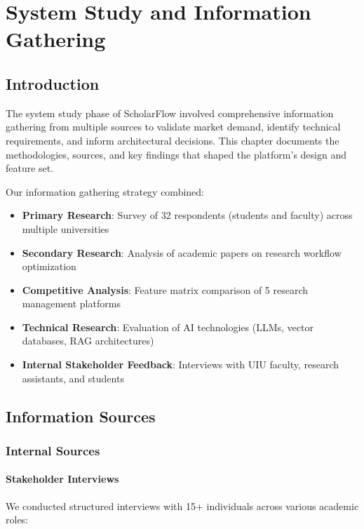 \chapter{System Study and Information Gathering}

\section{Introduction}

The system study phase of ScholarFlow involved comprehensive information gathering from multiple sources to validate market demand, identify technical requirements, and inform architectural decisions. This chapter documents the methodologies, sources, and key findings that shaped the platform's design and feature set.

Our information gathering strategy combined:
\begin{itemize}
    \item \textbf{Primary Research}: Survey of 32 respondents (students and faculty) across multiple universities
    \item \textbf{Secondary Research}: Analysis of academic papers on research workflow optimization
    \item \textbf{Competitive Analysis}: Feature matrix comparison of 5 research management platforms
    \item \textbf{Technical Research}: Evaluation of AI technologies (LLMs, vector databases, RAG architectures)
    \item \textbf{Internal Stakeholder Feedback}: Interviews with UIU faculty, research assistants, and students
\end{itemize}

\section{Information Sources}

\subsection{Internal Sources}

\subsubsection{Stakeholder Interviews}

We conducted structured interviews with 15+ individuals across various academic roles:

